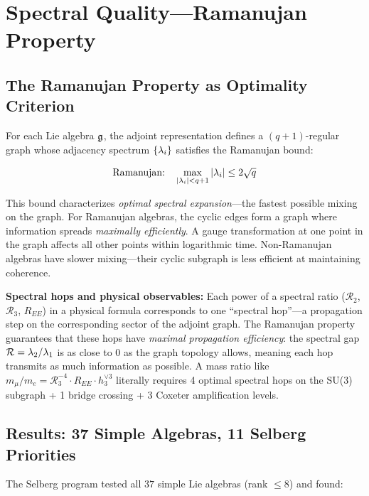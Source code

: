 \section{Spectral Quality---Ramanujan Property}\label{sec:spectral_quality}

\subsection{The Ramanujan Property as Optimality Criterion}\label{sec:ramanujan_def}

For each Lie algebra $\mathfrak{g}$, the adjoint representation defines a $(q+1)$-regular graph whose adjacency spectrum $\{\lambda_i\}$ satisfies the Ramanujan bound:

\begin{equation}
\text{Ramanujan:} \quad \max_{|\lambda_i| < q+1} |\lambda_i| \leq 2\sqrt{q}
\end{equation}

This bound characterizes \emph{optimal spectral expansion}---the fastest possible mixing on the graph. For Ramanujan algebras, the cyclic edges form a graph where information spreads \emph{maximally efficiently}. A gauge transformation at one point in the graph affects all other points within logarithmic time. Non-Ramanujan algebras have slower mixing---their cyclic subgraph is less efficient at maintaining coherence.

\textbf{Spectral hops and physical observables:} Each power of a spectral ratio ($\mathcal{R}_2$, $\mathcal{R}_3$, $R_{EE}$) in a physical formula corresponds to one ``spectral hop''---a propagation step on the corresponding sector of the adjoint graph. The Ramanujan property guarantees that these hops have \emph{maximal propagation efficiency}: the spectral gap $\mathcal{R} = \lambda_2/\lambda_1$ is as close to 0 as the graph topology allows, meaning each hop transmits as much information as possible. A mass ratio like $m_\mu/m_e = \mathcal{R}_3^{-4} \cdot R_{EE} \cdot h_3^{\vee 3}$ literally requires 4 optimal spectral hops on the SU(3) subgraph + 1 bridge crossing + 3 Coxeter amplification levels.

\subsection{Results: 37 Simple Algebras, 11 Selberg Priorities}\label{sec:ramanujan_results}

The Selberg program tested all $37$ simple Lie algebras (rank $\leq 8$) and found:

